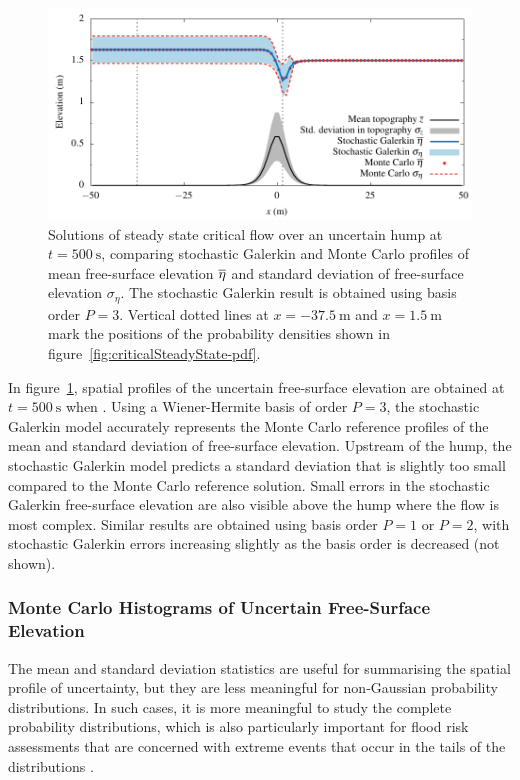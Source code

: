 \begin{figure}
    \centering
    \includegraphics{fig-criticalSteadyState-flow.pdf}
    \caption{Solutions of steady state critical flow over an uncertain hump at $t = \SI{500}{\second}$, comparing stochastic Galerkin and Monte Carlo profiles of mean free-surface elevation $\overline{\eta}$ and standard deviation of free-surface elevation $\sigma_\eta$.
    The stochastic Galerkin result is obtained using basis order $P = 3$.
    Vertical dotted lines at $x = \SI{-37.5}{\meter}$ and $x = \SI{1.5}{\meter}$ mark the positions of the probability densities shown in figure~\ref{fig:criticalSteadyState-pdf}.
    }
    \label{fig:criticalSteadyState-flow}
\end{figure}

In figure~\ref{fig:criticalSteadyState-flow}, spatial profiles of the uncertain free-surface elevation are obtained at $t = \SI{500}{\second}$ when .
Using a Wiener-Hermite basis of order $P=3$, the stochastic Galerkin model accurately represents the Monte Carlo reference profiles of the mean and standard deviation of free-surface elevation.
Upstream of the hump, the stochastic Galerkin model predicts a standard deviation that is slightly too small compared to the Monte Carlo reference solution.
Small errors in the stochastic Galerkin free-surface elevation are also visible above the hump where the flow is most complex.
Similar results are obtained using basis order $P=1$ or $P=2$, with stochastic Galerkin errors increasing slightly as the basis order is decreased (not shown).

\subsubsection{Monte Carlo Histograms of Uncertain Free-Surface Elevation}
The mean and standard deviation statistics are useful for summarising the spatial profile of uncertainty, but they are less meaningful for non-Gaussian probability distributions.
In such cases, it is more meaningful to study the complete probability distributions, which is also particularly important for flood risk assessments that are concerned with extreme events that occur in the tails of the distributions \citep{ge2011}.

